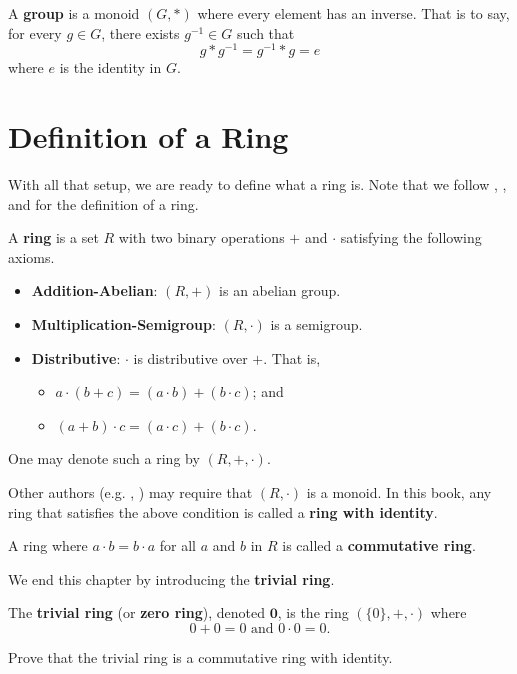 \begin{definition}
    A \textbf{group} is a monoid $(G, \ast)$ where every element has an inverse. That is to say, for every $g \in G$, there exists $g^{-1} \in G$ such that
    \[
        g \ast g^{-1} = g^{-1} \ast g = e
    \]
    where $e$ is the identity in $G$.
\end{definition}

\section{Definition of a Ring}
With all that setup, we are ready to define what a ring is. Note that we follow \cite[p.~223]{dummit_foote_2004}, \cite[p.~115, Definition 1.1]{hungerford_1980}, and \cite{proofwiki_ringdefinition} for the definition of a ring.
\begin{definition}
    A \textbf{ring} is a set $R$ with two binary operations $+$ and $\cdot$ satisfying the following axioms.
    \begin{itemize}
        \item \textbf{Addition-Abelian}: $(R, +)$ is an abelian group.
        \item \textbf{Multiplication-Semigroup}: $(R, \cdot)$ is a semigroup.
        \item \textbf{Distributive}: $\cdot$ is distributive over $+$. That is,
        \begin{itemize}
            \item $a \cdot (b + c) = (a \cdot b) + (b \cdot c)$; and
            \item $(a + b) \cdot c = (a \cdot c) + (b \cdot c)$.
        \end{itemize}
    \end{itemize}
    One may denote such a ring by $(R, +, \cdot)$.
\end{definition}
\begin{remark}
    Other authors (e.g. \cite[p.~136]{cohn_1982}, \cite[pp.~145--146]{clark_1984}) may require that $(R, \cdot)$ is a monoid. In this book, any ring that satisfies the above condition is called a \textbf{ring with identity}.
\end{remark}
\begin{remark}
    A ring where $a \cdot b = b \cdot a$ for all $a$ and $b$ in $R$ is called a \textbf{commutative ring}.
\end{remark}

We end this chapter by introducing the \textbf{trivial ring}.
\begin{definition}
    The \textbf{trivial ring} (or \textbf{zero ring}), denoted $\textbf{0}$, is the ring $(\{0\}, +, \cdot)$ where
    \[
        0 + 0 = 0 \text{ and } 0 \cdot 0 = 0.    
    \]
\end{definition}
\begin{exercise}
    Prove that the trivial ring is a commutative ring with identity.
\end{exercise}

